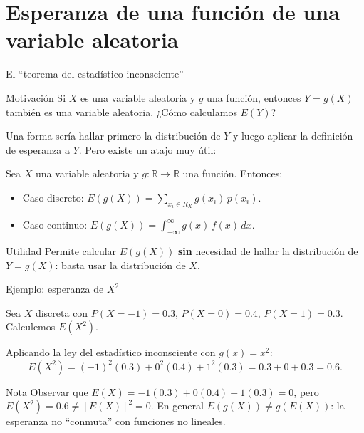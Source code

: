 \documentclass[aspectratio=169,11pt]{beamer}
\begin{document}
\section{Esperanza de una función de una variable aleatoria}

\begin{frame}{El ``teorema del estadístico inconsciente''}
\begin{block}{Motivación}
Si $X$ es una variable aleatoria y $g$ una función, entonces $Y = g(X)$ también es una variable aleatoria. ¿Cómo calculamos $E(Y)$?
\end{block}

Una forma sería hallar primero la distribución de $Y$ y luego aplicar la definición de esperanza a $Y$. Pero existe un atajo muy útil:

\begin{theorem}
Sea $X$ una variable aleatoria y $g: \mathbb{R} \to \mathbb{R}$ una función. Entonces:
\begin{itemize}
\item Caso discreto: $\displaystyle E(g(X)) = \sum_{x_i \in R_X} g(x_i)\, p(x_i)$.
\item Caso continuo: $\displaystyle E(g(X)) = \int_{-\infty}^{\infty} g(x)\, f(x)\, dx$.
\end{itemize}
\end{theorem}

\begin{alertblock}{Utilidad}
Permite calcular $E(g(X))$ \textbf{sin} necesidad de hallar la distribución de $Y=g(X)$: basta usar la distribución de $X$.
\end{alertblock}
\end{frame}

\begin{frame}{Ejemplo: esperanza de $X^2$}
\begin{example}
Sea $X$ discreta con $P(X=-1) = 0.3$, $P(X=0)=0.4$, $P(X=1)=0.3$. Calculemos $E(X^2)$.

\medskip
Aplicando la ley del estadístico inconsciente con $g(x) = x^2$:
\[
E(X^2) = (-1)^2(0.3) + 0^2(0.4) + 1^2(0.3) = 0.3 + 0 + 0.3 = 0.6.
\]
\end{example}

\begin{block}{Nota}
Observar que $E(X) = -1(0.3)+0(0.4)+1(0.3) = 0$, pero $E(X^2) = 0.6 \neq [E(X)]^2 = 0$. En general $E(g(X)) \neq g(E(X))$: la esperanza no ``conmuta'' con funciones no lineales.
\end{block}
\end{frame}
\end{document}
